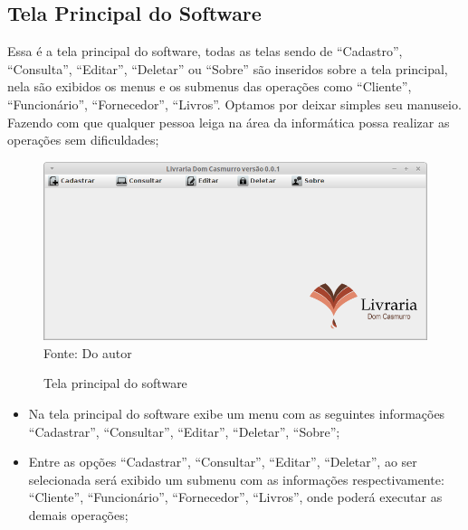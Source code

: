 \subsection{Tela Principal do Software}

 Essa é a tela principal do software, todas as telas sendo de “Cadastro”, “Consulta”, “Editar”, “Deletar” ou “Sobre” 
 são inseridos sobre a tela principal, nela são exibidos os menus e os submenus das operações como “Cliente”, “Funcionário”,
 “Fornecedor”, “Livros”. Optamos por deixar  simples seu manuseio. Fazendo com que qualquer pessoa leiga na área da informática
 possa realizar as operações sem dificuldades;
 
 \begin{figure}[H]
	\centering 
	\caption{Tela principal do software}
	\label{tela-principal}
	\includegraphics[scale = 0.6]{imagens/tela-principal.png}
	\\Fonte: Do autor
\end{figure}
 
 
 \begin{itemize}
  \item Na tela principal do software exibe um menu com as seguintes informações “Cadastrar”, “Consultar”, “Editar”,
  “Deletar”, “Sobre”;
  
  \item Entre as opções  “Cadastrar”, “Consultar”, “Editar”, “Deletar”,  ao ser selecionada será exibido um submenu com as 
  informações respectivamente:   “Cliente”, “Funcionário”, “Fornecedor”, “Livros”, onde poderá executar as demais operações;
 \end{itemize}
 

